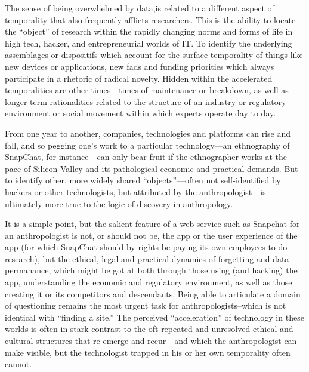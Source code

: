 \documentclass[10pt,letter,oneside]{scrartcl}
\begin{document}
The sense of being overwhelmed by data,is related to a different
aspect of temporality that also frequently afflicts researchers.  This
is the ability to locate the ``object'' of research within the rapidly
changing norms and forms of life in high tech, hacker, and
entrepreneurial worlds of IT. To identify the underlying assemblages
or dispositifs \cite{Rabinow2003} which account for the surface
temporality of things like new devices or applications, new fads and
funding priorities which always participate in a rhetoric of radical
novelty.  Hidden within the accelerated temporalities are other
times---times of maintenance or breakdown, as well as longer term
rationalities related to the structure of an industry or regulatory
environment or social movement within which experts operate day to
day.

From one year to another, companies, technologies and platforms can
rise and fall, and so pegging one's work to a particular
technology---an ethnography of SnapChat, for instance---can only bear
fruit if the ethnographer works at the pace of Silicon Valley and its
pathological economic and practical demands.  But to identify other,
more widely shared ``objects''---often not self-identified by hackers
or other technologists, but attributed by the anthropologist---is
ultimately more true to the logic of discovery in anthropology.

It is a simple point, but the salient feature of a web service such as
Snapchat for an anthropologist is not, or should not be, the app or
the user experience of the app (for which SnapChat should by rights be
paying its own employees to do research), but the ethical, legal and
practical dynamics of forgetting and data permanance, which might be
got at both through those using (and hacking) the app, understanding
the economic and regulatory environment, as well as those creating it
or its competitors and descendants.  Being able to articulate a domain
of questioning remains the most urgent task for anthropologists--which
is not identical with ``finding a site.''  The perceived
``acceleration'' of technology in these worlds is often in stark
contrast to the oft-repeated and unresolved ethical and cultural
structures that re-emerge and recur---and which the anthropologist can
make visible, but the technologist trapped in his or her own
temporality often cannot.

\end{document}
